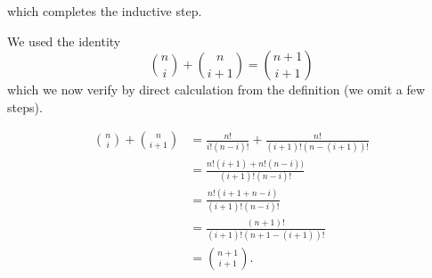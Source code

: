 \documentclass[11pt]{article}
\begin{document}
which completes the inductive step.

We used the identity
\[
\binom{n}{i}+\binom{n}{i+1} = \binom{n+1}{i+1}
\]
which we now verify by direct calculation from the definition (we omit
a few steps).

$$
\begin{array}{rl}
\binom{n}{i}+\binom{n}{i+1} &=
\frac{n!}{i!(n-i)!}+\frac{n!}{(i+1)!(n-(i+1))!}\\
&=\frac{n!(i+1)+n!(n-i))     } {(i+1)!(n-i)!}\\
&=\frac{n!(i+1+n-i)  } {(i+1)!(n-i)!}\\
&=\frac{(n+1)!} {(i+1)!(n+1-(i+1))!}\\
&= \binom{n+1}{i+1}.
\end{array}
$$
\end{document}
